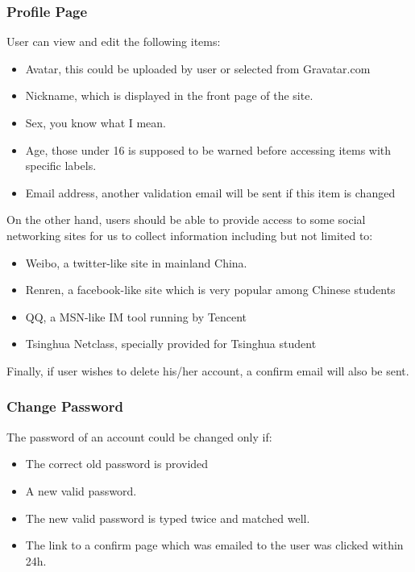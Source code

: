 \subsubsection{Profile Page}

User can view and edit the following items:

\begin{itemize}
\itemsep1pt\parskip0pt
\item
  Avatar, this could be uploaded by user or selected from Gravatar.com
\item
  Nickname, which is displayed in the front page of the site.
\item
  Sex, you know what I mean.
\item
  Age, those under 16 is supposed to be warned before accessing items
  with specific labels.
\item
  Email address, another validation email will be sent if this item is
  changed
\end{itemize}

On the other hand, users should be able to provide access to some social
networking sites for us to collect information including but not limited
to:

\begin{itemize}
\itemsep1pt\parskip0pt
\item
  Weibo, a twitter-like site in mainland China.
\item
  Renren, a facebook-like site which is very popular among Chinese
  students
\item
  QQ, a MSN-like IM tool running by Tencent
\item
  Tsinghua Netclass, specially provided for Tsinghua student
\end{itemize}

Finally, if user wishes to delete his/her account, a confirm email will
also be sent.

\subsubsection{Change Password}

The password of an account could be changed only if:

\begin{itemize}
\itemsep1pt\parskip0pt
\item
  The correct old password is provided
\item
  A new valid password.
\item
  The new valid password is typed twice and matched well.
\item
  The link to a confirm page which was emailed to the user was clicked
  within 24h.
\end{itemize}
